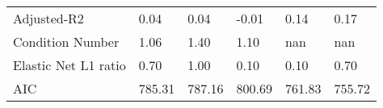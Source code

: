 \begin{table}
\begin{center}
\begin{tabular}{llllll}
Adjusted-R2                                    & 0.04    & 0.04    & -0.01  & 0.14    & 0.17      \\
Condition Number                               & 1.06    & 1.40    & 1.10   & nan     & nan       \\
Elastic Net L1 ratio                           & 0.70    & 1.00    & 0.10   & 0.10    & 0.70      \\
AIC                                            & 785.31  & 787.16  & 800.69 & 761.83  & 755.72    \\
\hline
\end{tabular}
\end{center}
\end{table}